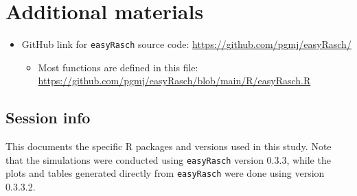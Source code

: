 \documentclass[
  letterpaper,
  DIV=11,
  numbers=noendperiod]{scrartcl}
\providecommand{\tightlist}{%
  \setlength{\itemsep}{0pt}\setlength{\parskip}{0pt}}\usepackage{longtable,booktabs,array}
\begin{document}
\section{Additional materials}\label{sec-addmat}

\begin{itemize}
\tightlist
\item
  GitHub link for \texttt{easyRasch} source code:
  \url{https://github.com/pgmj/easyRasch/}

  \begin{itemize}
  \tightlist
  \item
    Most functions are defined in this file:
    \url{https://github.com/pgmj/easyRasch/blob/main/R/easyRasch.R}
  \end{itemize}
\end{itemize}

\subsection{Session info}\label{session-info}

This documents the specific R packages and versions used in this study.
Note that the simulations were conducted using \texttt{easyRasch}
version 0.3.3, while the plots and tables generated directly from
\texttt{easyRasch} were done using version 0.3.3.2.
\end{document}
